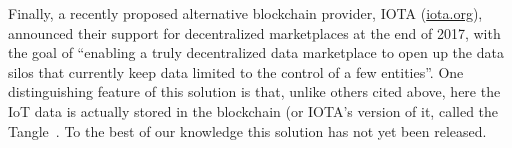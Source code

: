 \documentclass[letterpaper, 10 pt, conference]{ieeeconf}  %
\begin{document}
	

Finally, a recently proposed alternative blockchain provider, IOTA (\url{iota.org}), announced their support for decentralized marketplaces  at the end of 2017, with the goal of ``enabling a truly decentralized data marketplace to open up the data silos that currently keep data limited to the control of a few entities''. 
One distinguishing feature of this solution is that, unlike others cited above, here the IoT data is actually stored in the blockchain (or IOTA's version of it, called the Tangle~\cite{Popov2016}. 
To the best of our knowledge this solution has not yet been released.

\end{document}
